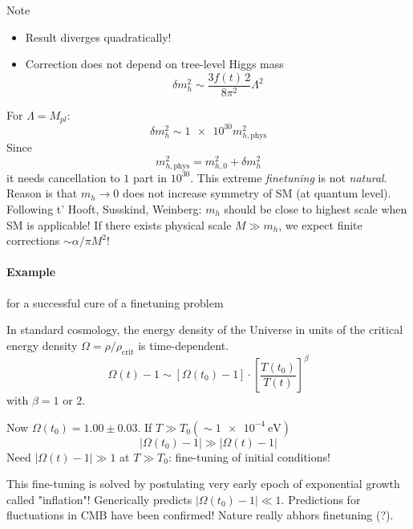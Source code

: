 Note
\begin{itemize}
   \item Result diverges quadratically!
   \item Correction does not depend on tree-level Higgs mass
      \begin{equation}
         \delta m_h^2 \sim \frac{3 f{(t)\, 2}}{8\pi^2 } \Lambda^2 \label{3.6}
      \end{equation}
\end{itemize}
For $\Lambda=M_{pl}$: 
\begin{equation}
   \delta m_h^2 \sim \num{1e30} m^2_{h, \text{phys}}  \label{3.7}
\end{equation}
Since 
\begin{equation}
   m^2_{h, \text{phys}} = m^2_{h,0} + \delta m^2_h \label{3.8}
\end{equation}
it needs cancellation to $1$ part in $10^{30}$. This extreme \textit{finetuning} is not \textit{natural}. Reason is that $m_h \rightarrow 0$ does not increase symmetry of SM (at quantum level). Following t' Hooft, Susskind, Weinberg: $m_h$ should be close to highest scale when SM is applicable! If there exists physical scale $M \gg m_h$, we expect finite corrections $\sim \alpha/\pi M^2$!

\paragraph{Example} for a successful cure of a finetuning problem

In standard cosmology, the energy density of the Universe in units of the critical energy density $\Omega = \rho / \rho_\text{crit}$ is time-dependent.
\begin{equation*}
   \Omega(t) - 1 \sim \left[ \Omega(t_0) - 1 \right] \cdot \left[ \frac{T(t_0)}{T(t)} \right]^{\beta}
\end{equation*}
with $\beta=1$ or $2$.

Now $\Omega(t_0) = 1.00 \pm 0.03$. If $ T \gg T_0 (\sim \SI{1e-4}{\eV})$
\begin{equation*}
   |\Omega(t_0) -1 | \gg |\Omega(t) - 1|
\end{equation*}
Need $|\Omega(t) - 1| \gg 1$ at $T \gg T_0$: fine-tuning of initial conditions!

This fine-tuning is solved by postulating very early epoch of exponential growth called "inflation"! Generically predicts $|\Omega(t_0) - 1| \ll 1$. Predictions for fluctuations in CMB have been confirmed! Nature really abhors finetuning (?).

